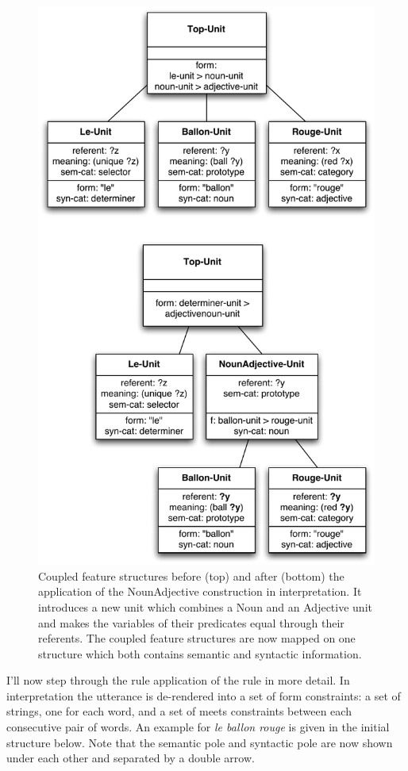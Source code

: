 \begin{figure}
  \begin{center}
    \includegraphics[width=.75\textwidth]{./frameworks/figures/nounadj-application.pdf}
    \caption[Coupled feature structures before and after the
    application of an example construction]{Coupled feature structures
      before (top) and after (bottom) the application of the
      NounAdjective construction in interpretation. It introduces a
      new unit which combines a Noun and an Adjective unit and makes
      the variables of their predicates equal through their
      referents. The coupled feature structures are now mapped on one
      structure which both contains semantic and syntactic
      information.}
    \label{f:nounadj-application}
  \end{center}
\end{figure}

I'll now step through the rule application of the rule in more
detail. In interpretation the utterance is de-rendered into a set of
form constraints: a set of strings, one for each word, and a set of
meets constraints between each consecutive pair of words. An example
for \textit{le ballon rouge} is given in the initial structure below. Note
that the semantic pole and syntactic pole are now shown under each
other and separated by a double arrow.

